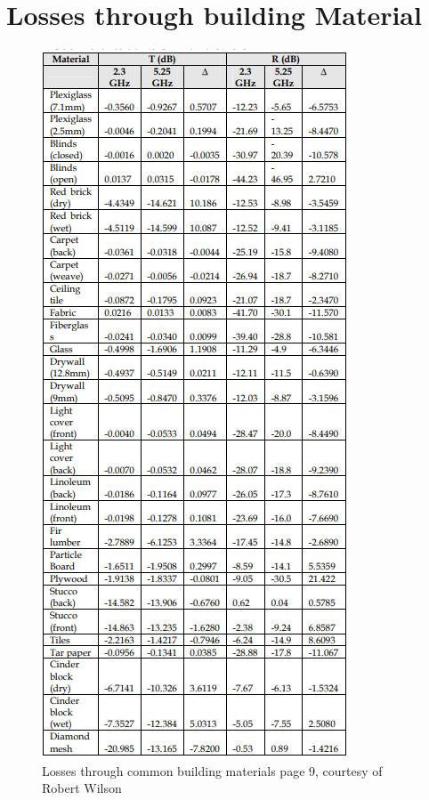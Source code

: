 \chapter{Losses through building Material}
\begin{figure}[h]
\centering
\includegraphics[scale=1]{figures/AbsorbsLoss.PNG}
\caption{Losses through common building materials\cite{Magis} page 9, courtesy of Robert Wilson  }
\end{figure}
